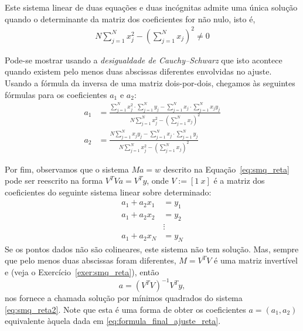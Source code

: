 Este sistema linear de duas equações e duas incógnitas admite uma única solução quando o determinante da matriz dos coeficientes for não nulo, isto é,  
\begin{eqnarray*}
N \sum_{j=1}^N x_j^2 - \left(\sum_{j=1}^N x_j\right)^2 \neq 0 
\end{eqnarray*}

Pode-se mostrar usando a \emph{desigualdade de Cauchy–Schwarz} que isto acontece quando existem pelo menos duas abscissas diferentes envolvidas no ajuste.  Usando a fórmula da inversa de uma matriz dois-por-dois, chegamos às seguintes fórmulas para os coeficientes $a_1$ e $a_2$:
  \begin{equation}\label{eq:formula_final_ajuste_reta}
    \begin{split}
    a_1 &= \frac{\sum_{j=1}^N x_j^2  \cdot \sum_{j=1}^N y_j - \sum_{j=1}^N x_j \cdot \sum_{j=1}^N x_jy_j}{N \sum_{j=1}^N x_j^2 - \left(\sum_{j=1}^N x_j\right)^2}\\
    a_2 &= \frac{N \sum_{j=1}^N x_jy_j - \sum_{j=1}^N x_j  \cdot \sum_{j=1}^N y_j }{N \sum_{j=1}^N x_j^2 - \left(\sum_{j=1}^N x_j\right)^2}      
    \end{split}
\end{equation}

Por fim, observamos que o sistema $Ma = w$ descrito na Equação~\eqref{eq:smq_reta} pode ser reescrito na forma $V^TVa = V^Ty$, onde $V := [1~x]$ é a matriz dos coeficientes do seguinte sistema linear sobre determinado:
\begin{equation}\label{eq:smq_reta2}
  \begin{split}
  a_1 + a_2x_1 &= y_1\\
  a_1 + a_2x_2 &= y_2\\
  &\vdots\\
  a_1 + a_2x_N &= y_N
  \end{split}
\end{equation}
Se os pontos dados não são colineares, este sistema não tem solução. Mas, sempre que pelo menos duas abscissas foram diferentes, $M = V^TV$ é uma matriz invertível e (veja o Exercício~\ref{exer:smq_reta}), então
\begin{equation}\label{eq:sol_smq_reta}
  a = \left(V^TV\right)^{-1}V^Ty,
\end{equation}
nos fornece a chamada solução por mínimos quadrados do sistema \eqref{eq:smq_reta2}. Note que esta é uma forma de obter os coeficientes $a = (a_1, a_2)$ equivalente àquela dada em \eqref{eq:formula_final_ajuste_reta}.


